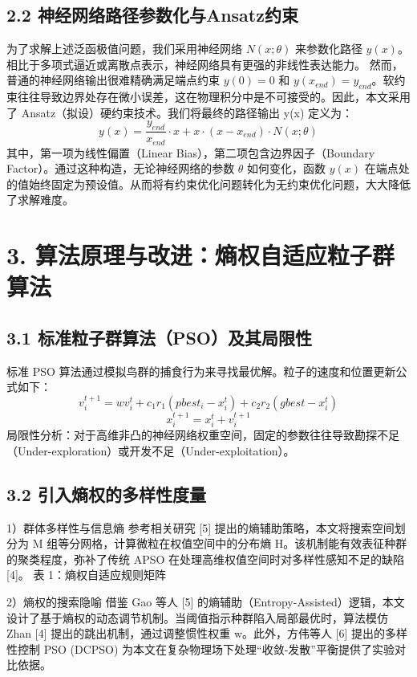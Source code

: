 \documentclass[twocolumn, 12pt]{article} %
\begin{document}
	\subsection{2.2 神经网络路径参数化与Ansatz约束}
	为了求解上述泛函极值问题，我们采用神经网络 $N(x;\theta)$ 来参数化路径 $y(x)$。相比于多项式逼近或离散点表示，神经网络具有更强的非线性表达能力。
	然而，普通的神经网络输出很难精确满足端点约束 $y(0)=0$ 和 $y(x_{end})=y_{end}$。软约束往往导致边界处存在微小误差，这在物理积分中是不可接受的。因此，本文采用了 Ansatz（拟设）硬约束技术。我们将最终的路径输出 y(x) 定义为：
	\begin{equation}
		y(x) = \frac{y_{end}}{x_{end}} \cdot x + x \cdot (x - x_{end}) \cdot N(x; \theta)
	\end{equation}
	其中，第一项为线性偏置（Linear Bias），第二项包含边界因子（Boundary Factor）。通过这种构造，无论神经网络的参数 $\theta$ 如何变化，函数 $y(x)$ 在端点处的值始终固定为预设值。从而将有约束优化问题转化为无约束优化问题，大大降低了求解难度。
	
	\section{3. 算法原理与改进：熵权自适应粒子群算法}
	\subsection{3.1 标准粒子群算法（PSO）及其局限性}
	标准 PSO 算法通过模拟鸟群的捕食行为来寻找最优解。粒子的速度和位置更新公式如下：
	\begin{equation}
		v_i^{t+1} = wv_i^t + c_1r_1(pbest_i - x_i^t) + c_2r_2(gbest - x_i^t)
	\end{equation}
	\begin{equation}
		x_i^{t+1} = x_i^t + v_i^{t+1}
	\end{equation}
	局限性分析：对于高维非凸的神经网络权重空间，固定的参数往往导致勘探不足（Under-exploration）或开发不足（Under-exploitation）。
	
	\subsection{3.2 引入熵权的多样性度量}
	1）群体多样性与信息熵
	参考相关研究 [5] 提出的熵辅助策略，本文将搜索空间划分为 M 组等分网格，计算微粒在权值空间中的分布熵 H。该机制能有效表征种群的聚类程度，弥补了传统 APSO 在处理高维权值空间时对多样性感知不足的缺陷 [4]。
	表 1：熵权自适应规则矩阵
	
	2）熵权的搜索隐喻
	借鉴 Gao 等人 [5] 的熵辅助（Entropy-Assisted）逻辑，本文设计了基于熵权的动态调节机制。当阈值指示种群陷入局部最优时，算法模仿 Zhan [4] 提出的跳出机制，通过调整惯性权重 w。此外，方伟等人 [6] 提出的多样性控制 PSO (DCPSO) 为本文在复杂物理场下处理“收敛-发散”平衡提供了实验对比依据。
	
\end{document}
